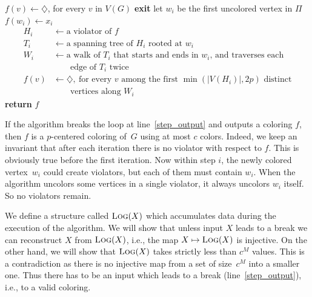 \begin{algorithm}
\caption{Input: $X=(x_1,\ldots,x_M)$ with $x_i\in\{1,\ldots,c\}$}
\label{algo-naive}
\begin{algorithmic}[1]
\State $f(v) \gets \diamondsuit$, for every $v$ in $V(G)$
\label{step_mainLoop}
  \label{step_breakingIf}
    \State\label{step_output} \textbf{exit}
  \EndIf
  \State\label{step_TakeUncoloredVertex} let $w_i$
                      be the first uncolored vertex in $\Pi$
  \State\label{step_assignColor} $f(w_i) \gets x_i$
  \label{step_mainIf}
  \begin{align*}
  H_i &\gets \textrm{a violator of $f$}\\
  T_i &\gets \textrm{a spanning tree of $H_i$ rooted at $w_i$}\\
  W_i &\gets \textrm{a walk of $T_i$ that starts and ends in $w_i$, and traverses each}\\
  &\qquad\textrm{edge of $T_i$ twice}\\
  f(v) &\gets\diamondsuit,\ \textrm{for every $v$ among the first $\min(|V(H_i)|,2p)$ distinct}\\
  &\qquad\textrm{vertices along $W_i$}
  \end{align*}
  \EndIf
\EndFor
\State \textbf{return} $f$
\end{algorithmic}
\end{algorithm}

If the algorithm breaks the loop at line~\ref{step_output} and outputs
a coloring $f$, then $f$ is a $p$-centered coloring of~$G$ using at
most $c$ colors. Indeed, we keep an invariant that after each
iteration there is no violator with respect to $f$.  This is obviously
true before the first iteration.  Now within step $i$, the newly
colored vertex~$w_i$ could create violators, but each of them must
contain $w_i$. When the algorithm uncolors some vertices in a single
violator, it always uncolors $w_i$ itself.
So no violators remain.

We define a structure called $\text{\scshape Log}(X)$ which accumulates data during the
execution of the algorithm.  We will show that unless input $X$ leads to a
break we can reconstruct $X$ from $\text{\scshape Log}(X)$, i.e., the map $X \mapsto \text{\scshape Log}(X)$
is injective. On the other hand, we will show that $\text{\scshape Log}(X)$ takes strictly
less than $c^M$ values.  This is a contradiction as there is no injective map
from a set of size~$c^M$ into a smaller one.  Thus there has to be an input
which leads to a break (line~\ref{step_output}), i.e., to a valid coloring.

